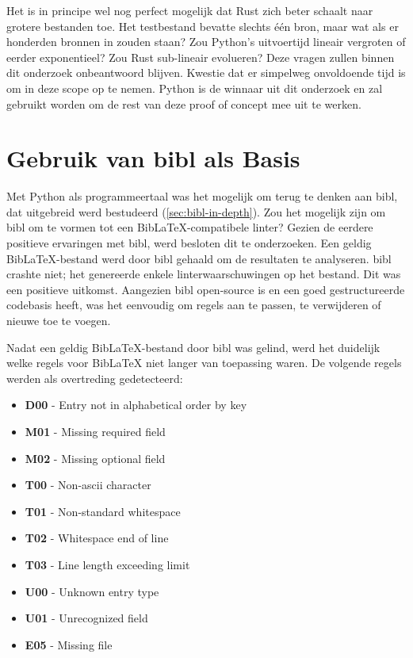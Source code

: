 Het is in principe wel nog perfect mogelijk dat Rust zich beter schaalt naar grotere bestanden toe. Het testbestand bevatte slechts één bron, maar wat als er honderden bronnen in zouden staan? Zou Python's uitvoertijd lineair vergroten of eerder exponentieel? Zou Rust sub-lineair evolueren? Deze vragen zullen binnen dit onderzoek onbeantwoord blijven. Kwestie dat er simpelweg onvoldoende tijd is om in deze scope op te nemen.\newline
Python is de winnaar uit dit onderzoek en zal gebruikt worden om de rest van deze proof of concept mee uit te werken.

\section{Gebruik van bibl als Basis}
Met Python als programmeertaal was het mogelijk om terug te denken aan bibl, dat uitgebreid werd bestudeerd (\ref{sec:bibl-in-depth}). Zou het mogelijk zijn om bibl om te vormen tot een BibLaTeX-compatibele linter? Gezien de eerdere positieve ervaringen met bibl, werd besloten dit te onderzoeken. Een geldig BibLaTeX-bestand werd door bibl gehaald om de resultaten te analyseren. bibl crashte niet; het genereerde enkele linterwaarschuwingen op het bestand. Dit was een positieve uitkomst. Aangezien bibl open-source is en een goed gestructureerde codebasis heeft, was het eenvoudig om regels aan te passen, te verwijderen of nieuwe toe te voegen.

Nadat een geldig BibLaTeX-bestand door bibl was gelind, werd het duidelijk welke regels voor BibLaTeX niet langer van toepassing waren. De volgende regels werden als overtreding gedetecteerd:
\begin{itemize}
    \item \textbf{D00} - Entry not in alphabetical order by key
    \item \textbf{M01} - Missing required field
    \item \textbf{M02} - Missing optional field
    \item \textbf{T00} - Non-ascii character
    \item \textbf{T01} - Non-standard whitespace
    \item \textbf{T02} - Whitespace end of line
    \item \textbf{T03} - Line length exceeding limit
    \item \textbf{U00} - Unknown entry type
    \item \textbf{U01} - Unrecognized field
    \item \textbf{E05} - Missing file
\end{itemize}

